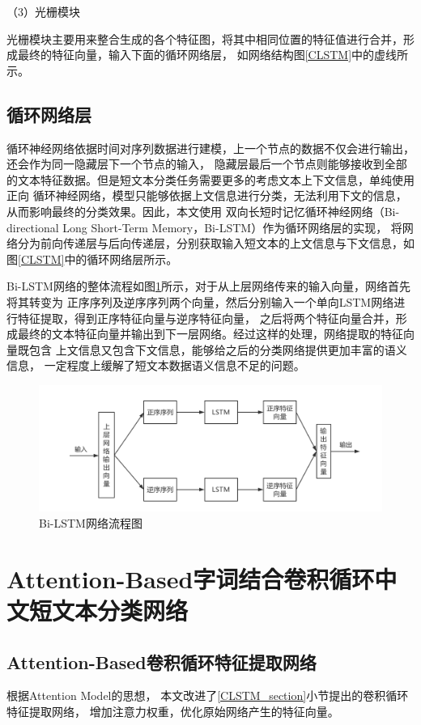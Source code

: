 （3）光栅模块

光栅模块主要用来整合生成的各个特征图，将其中相同位置的特征值进行合并，形成最终的特征向量，输入下面的循环网络层，
如网络结构图\ref{CLSTM}中的虚线所示。

\subsection{循环网络层}

循环神经网络依据时间对序列数据进行建模，上一个节点的数据不仅会进行输出，还会作为同一隐藏层下一个节点的输入，
隐藏层最后一个节点则能够接收到全部的文本特征数据。但是短文本分类任务需要更多的考虑文本上下文信息，单纯使用正向
循环神经网络，模型只能够依据上文信息进行分类，无法利用下文的信息，从而影响最终的分类效果。因此，本文使用
双向长短时记忆循环神经网络（Bi-directional Long Short-Term Memory，Bi-LSTM）作为循环网络层的实现，
将网络分为前向传递层与后向传递层，分别获取输入短文本的上文信息与下文信息，如图\ref{CLSTM}中的循环网络层所示。

Bi-LSTM网络的整体流程如图\ref{Bi-LSTM}所示，对于从上层网络传来的输入向量，网络首先将其转变为
正序序列及逆序序列两个向量，然后分别输入一个单向LSTM网络进行特征提取，得到正序特征向量与逆序特征向量，
之后将两个特征向量合并，形成最终的文本特征向量并输出到下一层网络。经过这样的处理，网络提取的特征向量既包含
上文信息又包含下文信息，能够给之后的分类网络提供更加丰富的语义信息，
一定程度上缓解了短文本数据语义信息不足的问题。
\begin{figure}[h]
    \includegraphics[scale=0.4]{picture/Bi-LSTM.png}
    \caption{Bi-LSTM网络流程图}
    \label{Bi-LSTM}
\end{figure}

\section{Attention-Based字词结合卷积循环中文短文本分类网络}
\subsection{Attention-Based卷积循环特征提取网络}
\label{ACLSTM_section}
根据Attention Model的思想，
本文改进了\ref{CLSTM_section}小节提出的卷积循环特征提取网络，
增加注意力权重，优化原始网络产生的特征向量。

